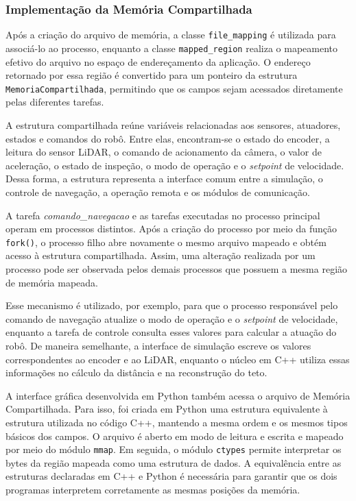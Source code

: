 \documentclass[12pt]{article}
\begin{document}
\subsubsection{Implementação da Memória Compartilhada}

Após a criação do arquivo de memória, a classe \texttt{file\_mapping} é utilizada para associá-lo ao processo, enquanto a classe \texttt{mapped\_region} realiza o mapeamento efetivo do arquivo no espaço de endereçamento da aplicação. O endereço retornado por essa região é convertido para um ponteiro da estrutura \texttt{MemoriaCompartilhada}, permitindo que os campos sejam acessados diretamente pelas diferentes tarefas.

A estrutura compartilhada reúne variáveis relacionadas aos sensores, atuadores, estados e comandos do robô. Entre elas, encontram-se o estado do encoder, a leitura do sensor LiDAR, o comando de acionamento da câmera, o valor de aceleração, o estado de inspeção, o modo de operação e o \textit{setpoint} de velocidade. Dessa forma, a estrutura representa a interface comum entre a simulação, o controle de navegação, a operação remota e os módulos de comunicação.

A tarefa \textit{comando\_navegacao} e as tarefas executadas no processo principal operam em processos distintos. Após a criação do processo por meio da função \texttt{fork()}, o processo filho abre novamente o mesmo arquivo mapeado e obtém acesso à estrutura compartilhada. Assim, uma alteração realizada por um processo pode ser observada pelos demais processos que possuem a mesma região de memória mapeada.

Esse mecanismo é utilizado, por exemplo, para que o processo responsável pelo comando de navegação atualize o modo de operação e o \textit{setpoint} de velocidade, enquanto a tarefa de controle consulta esses valores para calcular a atuação do robô. De maneira semelhante, a interface de simulação escreve os valores correspondentes ao encoder e ao LiDAR, enquanto o núcleo em C++ utiliza essas informações no cálculo da distância e na reconstrução do teto.

A interface gráfica desenvolvida em Python também acessa o arquivo de Memória Compartilhada. Para isso, foi criada em Python uma estrutura equivalente à estrutura utilizada no código C++, mantendo a mesma ordem e os mesmos tipos básicos dos campos. O arquivo é aberto em modo de leitura e escrita e mapeado por meio do módulo \texttt{mmap}. Em seguida, o módulo \texttt{ctypes} permite interpretar os bytes da região mapeada como uma estrutura de dados. A equivalência entre as estruturas declaradas em C++ e Python é necessária para garantir que os dois programas interpretem corretamente as mesmas posições da memória. 
\end{document}
